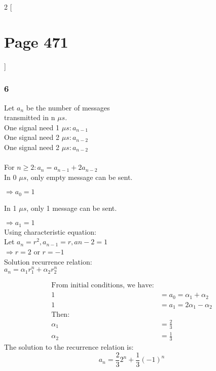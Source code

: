 \documentclass[12pt]{article}
\begin{document}
  \begin{multicols}{2}
    [\part*{Page 471}]
    \section*{6}
      Let \(a_n\) be the number of messages \\
      transmitted in n \(\mu s\). \\
      One signal need 1 \(\mu s: a_{n-1}\)\\
      One signal need 2 \(\mu s: a_{n-2}\)\\
      One signal need 2 \(\mu s: a_{n-2}\)\\\\
      For \(n\geq2: a_n=a_{n-1}+2a_{n-2}\)\\

      In 0 \(\mu s\), only empty message can be sent.
      \begin{center}
        \(\Rightarrow a_0=1\)
      \end{center}

      In 1 \(\mu s\), only 1 message can be sent.
      \begin{center}
        \(\Rightarrow a_1=1\)\\
        Using characteristic equation:\\
        Let \(a_n=r^2,a_{n-1}=r, a{n-2}=1\)\\
        \(\Rightarrow r=2\) or \(r=-1\)\\
        Solution recurrence relation: \\
        \(a_n=\alpha_1r^n_1+\alpha_2r^n_2\)
      \end{center}

      \begin{align*}
        \text{From initial conditions, we have:}\\
        1 &= a_0=\alpha_1+\alpha_2\\
        1 &= a_1=2\alpha_1-\alpha_2\\
        \text{Then:}\\
        \alpha_1&=\frac{2}{3}\\
        \alpha_2&=\frac{1}{3}
      \end{align*}
      The solution to the recurrence relation is:\\
      \[a_n=\frac{2}{3}2^n+\frac{1}{3}(-1)^n\]

\end{multicols}
\end{document}
